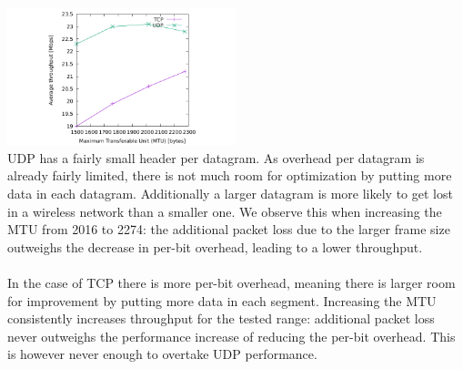 \includegraphics[width=0.5\textwidth]{traces/L3-4-1-tput.pdf} \\
UDP has a fairly small header per datagram. As overhead per datagram is already fairly limited, there is not much room for optimization by putting more data in each datagram. Additionally a larger datagram is more likely to get lost in a wireless network than a smaller one. We observe this when increasing the MTU from 2016 to 2274: the additional packet loss due to the larger frame size outweighs the decrease in per-bit overhead, leading to a lower throughput.
 \\ \\
In the case of TCP there is more per-bit overhead, meaning there is larger room for improvement by putting more data in each segment. Increasing the MTU consistently increases throughput for the tested range: additional packet loss never outweighs the performance increase of reducing the per-bit overhead. This is however never enough to overtake UDP performance.
